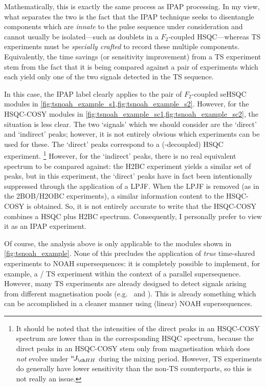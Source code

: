 Mathematically, this is exactly the same process as IPAP processing.
In my view, what separates the two is the fact that the IPAP technique seeks to disentangle components which are \textit{innate} to the pulse sequence under consideration and cannot usually be isolated---such as doublets in a $F_2$-coupled HSQC---whereas TS experiments must be \textit{specially crafted} to record these multiple components.
Equivalently, the time savings (or sensitivity improvement) from a TS experiment stem from the fact that it is being compared against a pair of experiments which each yield only one of the two signals detected in the TS sequence.

In this case, the IPAP label clearly applies to the pair of $F_2$-coupled seHSQC modules in \cref{fig:tsnoah_example_s1,fig:tsnoah_example_s2}.
However, for the HSQC-COSY modules in \cref{fig:tsnoah_example_sc1,fig:tsnoah_example_sc2}, the situation is less clear.
The two `signals' which we should consider are the `direct' and `indirect' peaks; however, it is not entirely obvious which experiments can be used for these.
The `direct' peaks correspond to a (\carbon{}-decoupled) HSQC experiment.%
\footnote{It should be noted that the intensities of the direct peaks in an HSQC-COSY spectrum are lower than in the corresponding HSQC spectrum, because the direct peaks in an HSQC-COSY stem only from magnetisation which does \textit{not} evolve under $\nJ{HH}$ during the mixing period. However, TS experiments do generally have lower sensitivity than the non-TS counterparts, so this is not really an issue.}
However, for the `indirect' peaks, there is no real equivalent spectrum to be compared against: the H2BC experiment\autocite{Nyberg2005JACS,Nyberg2005MRC} yields a similar set of peaks, but in this experiment, the `direct' peaks have in fact been intentionally suppressed through the application of a LPJF.
When the LPJF is removed (as in the 2BOB/H2OBC experiments\autocite{Kupce2017MRC}), a similar information content to the HSQC-COSY is obtained.
So, it is not entirely accurate to write that the HSQC-COSY combines a HSQC plus H2BC spectrum.
Consequently, I personally prefer to view it as an IPAP experiment.

Of course, the analysis above is only applicable to the modules shown in \cref{fig:tsnoah_example}.
None of this precludes the application of \textit{true} time-shared experiments to NOAH supersequences: it is completely possible to implement, for example, a \carbon{}/\nitrogen{} TS experiment within the context of a parallel supersequence.
However, many TS experiments are already designed to detect signals arising from different magnetisation pools (e.g.\  and ).
This is already something which can be accomplished in a cleaner manner using (linear) NOAH supersequences.


